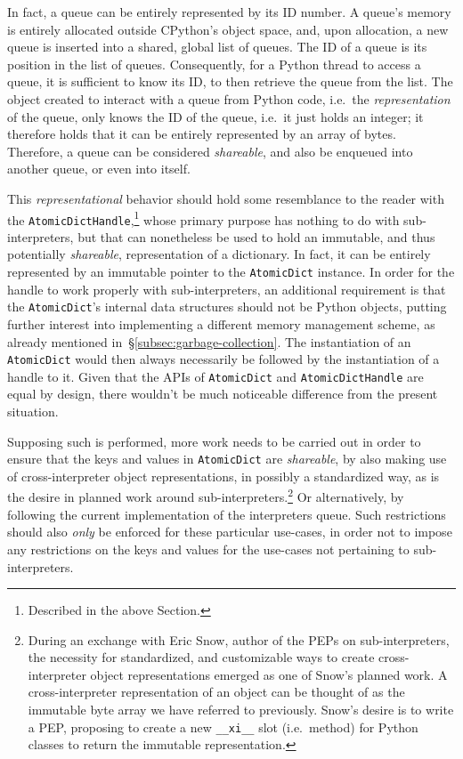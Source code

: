 In fact, a queue can be entirely represented by its ID number.
A queue's memory is entirely allocated outside CPython's object space, and, upon allocation, a new queue is inserted into a shared, global list of queues.
The ID of a queue is its position in the list of queues.
Consequently, for a Python thread to access a queue, it is sufficient to know its ID, to then retrieve the queue from the list.
The object created to interact with a queue from Python code, i.e.\ the \emph{representation} of the queue, only knows the ID of the queue, i.e.\ it just holds an integer; it therefore holds that it can be entirely represented by an array of bytes.
Therefore, a queue can be considered \emph{shareable}, and also be enqueued into another queue, or even into itself.

This \emph{representational} behavior should hold some resemblance to the reader with the \texttt{AtomicDictHandle},\footnote{%
    Described in the above Section.
} whose primary purpose has nothing to do with sub-interpreters, but that can nonetheless be used to hold an immutable, and thus potentially \emph{shareable}, representation of a dictionary.
In fact, it can be entirely represented by an immutable pointer to the \texttt{AtomicDict} instance.
In order for the handle to work properly with sub-interpreters, an additional requirement is that the \texttt{AtomicDict}'s internal data structures should not be Python objects, putting further interest into implementing a different memory management scheme, as already mentioned in~\S\ref{subsec:garbage-collection}.
The instantiation of an \texttt{AtomicDict} would then always necessarily be followed by the instantiation of a handle to it.
Given that the APIs of \texttt{AtomicDict} and \texttt{AtomicDictHandle} are equal by design, there wouldn't be much noticeable difference from the present situation.

Supposing such is performed, more work needs to be carried out in order to ensure that the keys and values in \texttt{AtomicDict} are \emph{shareable}, by also making use of cross-interpreter object representations, in possibly a standardized way, as is the desire in planned work around sub-interpreters.\footnote{%
    During an exchange with Eric Snow, author of the PEPs on sub-interpreters, the necessity for standardized, and customizable ways to create cross-interpreter object representations emerged as one of Snow's planned work.
    A cross-interpreter representation of an object can be thought of as the immutable byte array we have referred to previously.
    Snow's desire is to write a PEP, proposing to create a new \texttt{\_\_xi\_\_} slot (i.e.\ method) for Python classes to return the immutable representation.
}
Or alternatively, by following the current implementation of the interpreters queue.
Such restrictions should also \emph{only} be enforced for these particular use-cases, in order not to impose any restrictions on the keys and values for the use-cases not pertaining to sub-interpreters.


